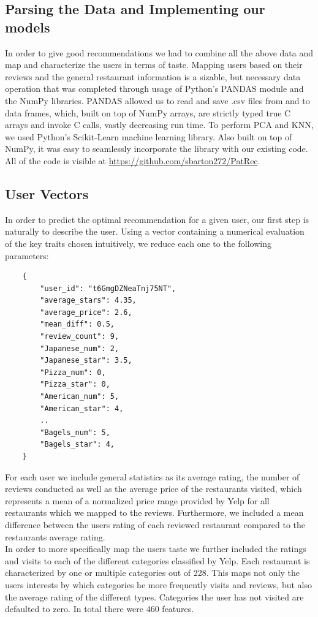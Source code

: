 \documentclass[10pt,twocolumn,letterpaper]{article}
\begin{document}
\subsection{Parsing the Data and Implementing our models}
In order to give good recommendations we had to combine all the above data and map and characterize the users in terms of taste. Mapping users based on their reviews and the general restaurant information is a sizable, but necessary data operation that was completed through usage of Python's PANDAS module and the NumPy libraries. PANDAS allowed us to read and save .csv files from and to data frames, which, built on top of NumPy arrays, are strictly typed true C arrays and invoke C calls, vastly decreasing run time. To perform PCA and KNN, we used Python's Scikit-Learn machine learning library. Also built on top of NumPy, it was easy to seamlessly incorporate the library with our existing code. All of the code is visible at \url{https://github.com/sbarton272/PatRec}.

\subsection{User Vectors}
In order to predict the optimal recommendation for a given user, our first step is naturally to describe the user. Using a vector containing a numerical evaluation of the key traits chosen intuitively, we reduce each one to the following parameters:
\begin{verbatim}
	{
	    "user_id": "t6GmgDZNeaTnj75NT",
	    "average_stars": 4.35,
	    "average_price": 2.6,
	   	"mean_diff": 0.5,
	   	"review_count": 9,
	   	"Japanese_num": 2,
	   	"Japanese_star": 3.5,
	   	"Pizza_num": 0,
	   	"Pizza_star": 0,
	   	"American_num": 5,
	   	"American_star": 4,
	   	..
	   	"Bagels_num": 5,
	   	"Bagels_star": 4,
	}
\end{verbatim}

For each user we include general statistics as its average rating, the number of reviews conducted as well as the average price of the restaurants visited, which represents a mean of a normalized price range provided by Yelp for all restaurants which we mapped to the reviews. Furthermore, we included a mean difference between the users rating of each reviewed restaurant compared to the restaurants average rating. 
\\[.5em]
\indent In order to more specifically map the users taste we further included the ratings and visits to each of the different categories classified by Yelp. Each restaurant is characterized by one or multiple categories out of 228. This maps not only the users interests by which categories he more frequently visits and reviews, but also the average rating of the different types. Categories the user has not visited are defaulted to zero. In total there were 460 features.
\end{document}

